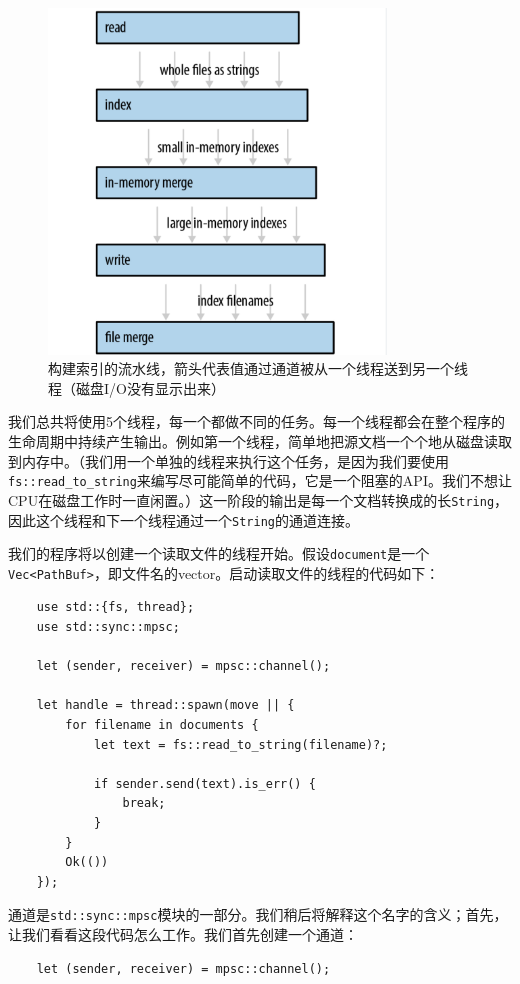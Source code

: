 \begin{figure}[htbp]
    \centering
    \includegraphics[width=0.8\textwidth]{../img/f19-7.png}
    \caption{构建索引的流水线，箭头代表值通过通道被从一个线程送到另一个线程（磁盘I/O没有显示出来）}
    \label{f19-7}
\end{figure}

我们总共将使用5个线程，每一个都做不同的任务。每一个线程都会在整个程序的生命周期中持续产生输出。例如第一个线程，简单地把源文档一个个地从磁盘读取到内存中。（我们用一个单独的线程来执行这个任务，是因为我们要使用\texttt{fs::read\_to\_string}来编写尽可能简单的代码，它是一个阻塞的API。我们不想让CPU在磁盘工作时一直闲置。）这一阶段的输出是每一个文档转换成的长\texttt{String}，因此这个线程和下一个线程通过一个\texttt{String}的通道连接。

我们的程序将以创建一个读取文件的线程开始。假设\texttt{document}是一个\texttt{Vec<PathBuf>}，即文件名的vector。启动读取文件的线程的代码如下：
\begin{verbatim}
    use std::{fs, thread};
    use std::sync::mpsc;

    let (sender, receiver) = mpsc::channel();

    let handle = thread::spawn(move || {
        for filename in documents {
            let text = fs::read_to_string(filename)?;

            if sender.send(text).is_err() {
                break;
            }
        }
        Ok(())
    });
\end{verbatim}

通道是\texttt{std::sync::mpsc}模块的一部分。我们稍后将解释这个名字的含义；首先，让我们看看这段代码怎么工作。我们首先创建一个通道：
\begin{verbatim}
    let (sender, receiver) = mpsc::channel();
\end{verbatim}

